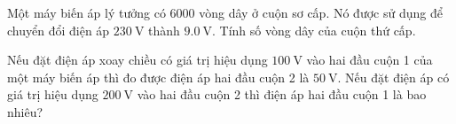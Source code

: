 \begin{ex}
	Một máy biến áp lý tưởng có 6000 vòng dây ở cuộn sơ cấp. Nó được sử dụng để chuyển đổi điện áp $\SI{230}{\volt}$ thành $\SI{9.0}{\volt}$. Tính số vòng dây của cuộn thứ cấp.	
\end{ex}
\begin{ex}
	Nếu đặt điện áp xoay chiều có giá trị hiệu dụng $\SI{100}{\volt}$ vào hai đầu cuộn 1 của một máy biến áp thì đo được điện áp hai đầu cuộn 2 là $\SI{50}{\volt}$. Nếu đặt điện áp có giá trị hiệu dụng $\SI{200}{\volt}$ vào hai đầu cuộn 2 thì điện áp hai đầu cuộn 1 là bao nhiêu?
\end{ex}





